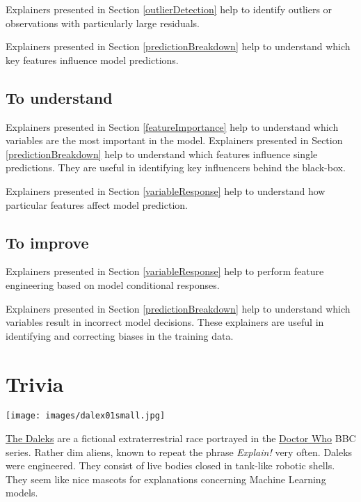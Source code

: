 \documentclass[]{book}
\theoremstyle{definition}
\theoremstyle{definition}
\theoremstyle{definition}
\theoremstyle{remark}
\begin{document}
Explainers presented in Section \ref{outlierDetection} help to identify
outliers or observations with particularly large residuals.

Explainers presented in Section \ref{predictionBreakdown} help to
understand which key features influence model predictions.

\hypertarget{to-understand}{%
\subsection{To understand}\label{to-understand}}

Explainers presented in Section \ref{featureImportance} help to
understand which variables are the most important in the model.
Explainers presented in Section \ref{predictionBreakdown} help to
understand which features influence single predictions. They are useful
in identifying key influencers behind the black-box.

Explainers presented in Section \ref{variableResponse} help to
understand how particular features affect model prediction.

\hypertarget{to-improve}{%
\subsection{To improve}\label{to-improve}}

Explainers presented in Section \ref{variableResponse} help to perform
feature engineering based on model conditional responses.

Explainers presented in Section \ref{predictionBreakdown} help to
understand which variables result in incorrect model decisions. These
explainers are useful in identifying and correcting biases in the
training data.

\hypertarget{trivia}{%
\section{Trivia}\label{trivia}}

{ \texttt{[image: images/dalex01small.jpg]} }

\href{https://en.wikipedia.org/wiki/Dalek}{The Daleks} are a fictional
extraterrestrial race portrayed in the
\href{https://en.wikipedia.org/wiki/Doctor_Who}{Doctor Who} BBC series.
Rather dim aliens, known to repeat the phrase \emph{Explain!} very
often. Daleks were engineered. They consist of live bodies closed in
tank-like robotic shells. They seem like nice mascots for explanations
concerning Machine Learning models.
\end{document}
